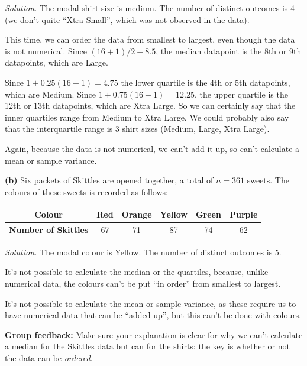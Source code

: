 \documentclass[
  a4paper,
]{book}
\theoremstyle{definition}
\theoremstyle{definition}
\theoremstyle{definition}
\theoremstyle{definition}
\theoremstyle{remark}
\begin{document}
\begin{myanswers}
\emph{Solution.}
The modal shirt size is medium. The number of distinct outcomes is 4 (we don't quite ``Xtra Small'', which was not observed in the data).

This time, we can order the data from smallest to largest, even though the data is not numerical. Since \((16 + 1)/2 - 8.5\), the median datapoint is the 8th or 9th datapoints, which are Large.

Since \(1 + 0.25(16 - 1) = 4.75\) the lower quartile is the 4th or 5th datapoints, which are Medium. Since \(1 + 0.75(16-1) = 12.25\), the upper quartile is the 12th or 13th datapoints, which are Xtra Large. So we can certainly say that the inner quartiles range from Medium to Xtra Large. We could probably also say that the interquartile range is 3 shirt sizes (Medium, Large, Xtra Large).

Again, because the data is not numerical, we can't add it up, so can't calculate a mean or sample variance.

\end{myanswers}

\textbf{(b)} Six packets of Skittles are opened together, a total of \(n = 361\) sweets. The colours of these sweets is recorded as follows:

\begin{longtable}[]{@{}cccccc@{}}
\toprule()
\textbf{Colour} & Red & Orange & Yellow & Green & Purple \\
\midrule()
\endhead
\textbf{Number of Skittles} & 67 & 71 & 87 & 74 & 62 \\
\bottomrule()
\end{longtable}

\begin{myanswers}
\emph{Solution.}
The modal colour is Yellow. The number of distinct outcomes is 5.

It's not possible to calculate the median or the quartiles, because, unlike numerical data, the colours can't be put ``in order'' from smallest to largest.

It's not possible to calculate the mean or sample variance, as these require us to have numerical data that can be ``added up'', but this can't be done with colours.

\textbf{Group feedback:} Make sure your explanation is clear for why we can't calculate a median for the Skittles data but can for the shirts: the key is whether or not the data can be \emph{ordered}.

\end{myanswers}
\end{document}
